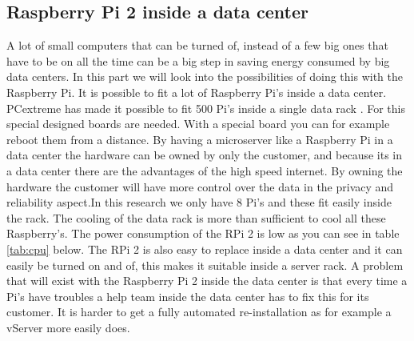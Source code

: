 \documentclass{sig-alternate-br}
\begin{document}
\subsection{Raspberry Pi 2 inside a data center}

A lot of small computers that can be turned of, instead of a few big ones that have to be on all the time can be a big step in saving energy consumed by big data centers. In this part we will look into the possibilities of doing this with the Raspberry Pi. \newline
It is possible to fit a lot of Raspberry Pi's inside a data center. PCextreme has made it possible to fit 500 Pi's inside a single data rack \cite{Pcextreme}. For this special designed boards are needed. With a special board you can for example reboot them from a distance. By having a microserver like a Raspberry Pi in a data center the hardware can be owned by only the customer, and because its in a data center there are the advantages of the high speed internet. By owning the hardware the customer will have more control over the data in the privacy and reliability aspect.\newline In this research we only have 8 Pi's and these fit easily inside the rack. The cooling of the data rack is more than sufficient to cool all these Raspberry's. The power consumption of the RPi 2 is low as you can see in table \ref{tab:cpu} below. The RPi 2 is also easy to replace inside a data center and it can easily be turned on and of, this makes it suitable inside a server rack. A problem that will exist with the Raspberry Pi 2 inside the data center is that every time a Pi's have troubles a help team inside the data center has to fix this for its customer. It is harder to get  a fully automated re-installation as for example a vServer more easily does. 
\end{document}

